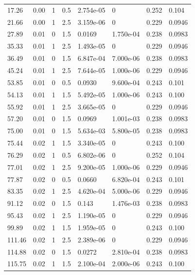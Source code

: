 \documentclass[preview]{standalone}
\begin{document}
{{\begin{tabular}{L{1.2cm}C{1.2cm} C{0.3cm}C{0.5cm} C{1.4cm}C{1.4cm} C{1.4cm}C{1.4cm}}
  17.26  &  0.00  & 1     & 0.5 &  2.754e-05  & 0  & 0.252 &  0.104   \\ 
  21.66  &  0.00  & 1     & 2.5 &  3.159e-06  & 0  & 0.229 &  0.0946   \\ 
  27.89  &  0.01  & 0     & 1.5 &  0.0169  & 1.750e-04  & 0.238 &  0.0983   \\ 
  35.33  &  0.01  & 1     & 2.5 &  1.493e-05  & 0  & 0.229 &  0.0946   \\ 
  36.49  &  0.01  & 0     & 1.5 &  6.847e-04  & 7.000e-06  & 0.238 &  0.0983   \\ 
  45.24  &  0.01  & 1     & 2.5 &  7.644e-05  & 1.000e-06  & 0.229 &  0.0946   \\ 
  53.85  &  0.01  & 0     & 0.5 &  0.0930  & 9.600e-04  & 0.243 &  0.101   \\ 
  54.13  &  0.01  & 1     & 1.5 &  5.492e-05  & 1.000e-06  & 0.243 &  0.100   \\ 
  55.92  &  0.01  & 1     & 2.5 &  3.665e-05  & 0  & 0.229 &  0.0946   \\ 
  57.20  &  0.01  & 0     & 1.5 &  0.0969  & 1.001e-03  & 0.238 &  0.0983   \\ 
  75.00  &  0.01  & 0     & 1.5 &  5.634e-03  & 5.800e-05  & 0.238 &  0.0983   \\ 
  75.44  &  0.02  & 1     & 1.5 &  3.340e-05  & 0  & 0.243 &  0.100   \\ 
  76.29  &  0.02  & 1     & 0.5 &  6.802e-06  & 0  & 0.252 &  0.104   \\ 
  77.01  &  0.02  & 1     & 2.5 &  9.200e-05  & 1.000e-06  & 0.229 &  0.0946   \\ 
  77.87  &  0.02  & 0     & 0.5 &  0.0660  & 6.820e-04  & 0.243 &  0.101   \\ 
  83.35  &  0.02  & 1     & 2.5 &  4.620e-04  & 5.000e-06  & 0.229 &  0.0946   \\ 
  91.12  &  0.02  & 0     & 1.5 &  0.143  & 1.476e-03  & 0.238 &  0.0983   \\ 
  95.43  &  0.02  & 1     & 2.5 &  1.190e-05  & 0  & 0.229 &  0.0946   \\ 
  99.89  &  0.02  & 1     & 1.5 &  1.959e-05  & 0  & 0.243 &  0.100   \\ 
  111.46  &  0.02  & 1     & 2.5 &  2.389e-06  & 0  & 0.229 &  0.0946   \\ 
  114.88  &  0.02  & 0     & 1.5 &  0.0272  & 2.810e-04  & 0.238 &  0.0983   \\ 
  115.75  &  0.02  & 1     & 1.5 &  2.100e-04  & 2.000e-06  & 0.243 &  0.100   \\ 

\end{tabular}}}
\end{document}
